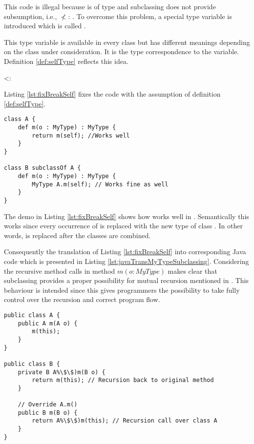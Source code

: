 This code is illegal because \self is of type \B and subclassing does
not provide subsumption, i.e., \B $\nless$: \A. To overcome this problem,
a special type variable is introduced which is called \mytype.

This type variable is available in every class but has different meanings
depending on the class under consideration. It is the type correspondence
to the \self variable. Definition \ref{def:selfType} reflects this idea.

\begin{defn}
	\label{def:selfType}
	\self <: \mytype
\end{defn}

Listing \ref{lst:fixBreakSelf} fixes the code with the assumption of
definition \ref{def:selfType}.

\begin{lstlisting}[float,language=ooplss,caption=Type safe code with \mytype,label=lst:fixBreakSelf]
class A {
	def m(o : MyType) : MyType {
		return m(self); //Works well
	}
}

class B subclassOf A {
	def m(o : MyType) : MyType {
		MyType A.m(self); // Works fine as well
	}
}
\end{lstlisting}

The demo in Listing \ref{lst:fixBreakSelf} shows how \mytype works well
in \ooplss.  Semantically this works since every occurrence of \mytype
is replaced with the new type of class \B. In other words, \mytype is
replaced after the classes are combined.

Consequently the translation of Listing \ref{lst:fixBreakSelf}
into corresponding Java code which is presented in Listing
\ref{lst:javaTransMyTypeSubclassing}. Considering the recursive
method calls in method $m(o : MyType)$ makes clear that subclassing
provides a proper possibility for mutual recursion mentioned in
. This behaviour is intended since this gives
programmers the possibility to take fully control over the recursion
and correct program flow.

\begin{lstlisting}[float,caption=Subclassing with \mytype translated in Java,label=lst:javaTransMyTypeSubclassing]
public class A {
	public A m(A o) {
		m(this);
	}
}

public class B {
	private B A%\$\$)m(B o) {
		return m(this); // Recursion back to original method
	}

	// Override A.m()
	public B m(B o) {
		return A%\$\$)m(this); // Recursion call over class A
	}
}
\end{lstlisting}

